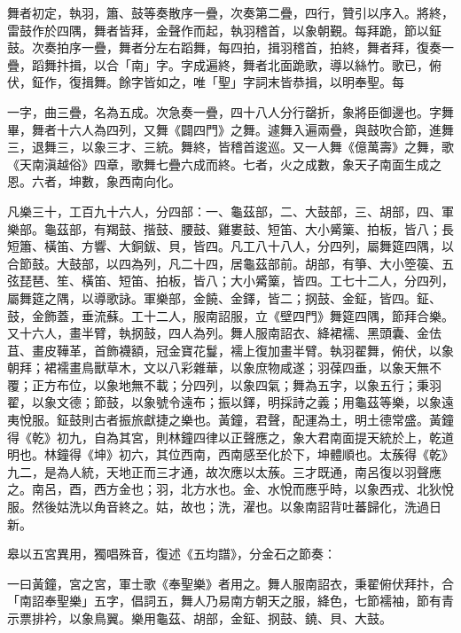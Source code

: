 \begin{pinyinscope}
 舞者初定，執羽，簫、鼓等奏散序一疊，次奏第二疊，四行，贊引以序入。將終，雷鼓作於四隅，舞者皆拜，金聲作而起，執羽稽首，以象朝覲。每拜跪，節以鉦鼓。次奏拍序一疊，舞者分左右蹈舞，每四拍，揖羽稽首，拍終，舞者拜，復奏一疊，蹈舞抃揖，以合「南」字。字成遍終，舞者北面跪歌，導以絲竹。歌已，俯伏，鉦作，復揖舞。餘字皆如之，唯「聖」字詞末皆恭揖，以明奉聖。每



 一字，曲三疊，名為五成。次急奏一疊，四十八人分行罄折，象將臣御邊也。字舞畢，舞者十六人為四列，又舞《闢四門》之舞。遽舞入遍兩疊，與鼓吹合節，進舞三，退舞三，以象三才、三統。舞終，皆稽首逡巡。又一人舞《億萬壽》之舞，歌《天南滇越俗》四章，歌舞七疊六成而終。七者，火之成數，象天子南面生成之恩。六者，坤數，象西南向化。



 凡樂三十，工百九十六人，分四部：一、龜茲部，二、大鼓部，三、胡部，四、軍樂部。龜茲部，有羯鼓、揩鼓、腰鼓、雞婁鼓、短笛、大小觱篥、拍板，皆八；長短簫、橫笛、方響、大銅鈸、貝，皆四。凡工八十八人，分四列，屬舞筵四隅，以合節鼓。大鼓部，以四為列，凡二十四，居龜茲部前。胡部，有箏、大小箜篌、五弦琵琶、笙、橫笛、短笛、拍板，皆八；大小觱篥，皆四。工七十二人，分四列，屬舞筵之隅，以導歌詠。軍樂部，金饒、金鐸，皆二；㧏鼓、金鉦，皆四。鉦、鼓，金飾蓋，垂流蘇。工十二人，服南詔服，立《壁四門》舞筵四隅，節拜合樂。又十六人，畫半臂，執㧏鼓，四人為列。舞人服南詔衣、絳裙襦、黑頭囊、金佉苴、畫皮鞾革，首飾襪額，冠金寶花鬘，襦上復加畫半臂。執羽翟舞，俯伏，以象朝拜；裙襦畫鳥獸草木，文以八彩雜華，以象庶物咸遂；羽葆四垂，以象天無不覆；正方布位，以象地無不載；分四列，以象四氣；舞為五字，以象五行；秉羽翟，以象文德；節鼓，以象號令遠布；振以鐸，明採詩之義；用龜茲等樂，以象遠夷悅服。鉦鼓則古者振旅獻捷之樂也。黃鐘，君聲，配運為土，明土德常盛。黃鐘得《乾》初九，自為其宮，則林鐘四律以正聲應之，象大君南面提天統於上，乾道明也。林鐘得《坤》初六，其位西南，西南感至化於下，坤體順也。太蔟得《乾》九二，是為人統，天地正而三才通，故次應以太蔟。三才既通，南呂復以羽聲應之。南呂，酉，西方金也；羽，北方水也。金、水悅而應乎時，以象西戎、北狄悅服。然後姑洗以角音終之。姑，故也；洗，濯也。以象南詔背吐蕃歸化，洗過日新。



 皋以五宮異用，獨唱殊音，復述《五均譜》，分金石之節奏：



 一曰黃鐘，宮之宮，軍士歌《奉聖樂》者用之。舞人服南詔衣，秉翟俯伏拜抃，合「南詔奉聖樂」五字，倡詞五，舞人乃易南方朝天之服，絳色，七節襦袖，節有青示票排衿，以象鳥翼。樂用龜茲、胡部，金鉦、㧏鼓、鐃、貝、大鼓。




\end{pinyinscope}
